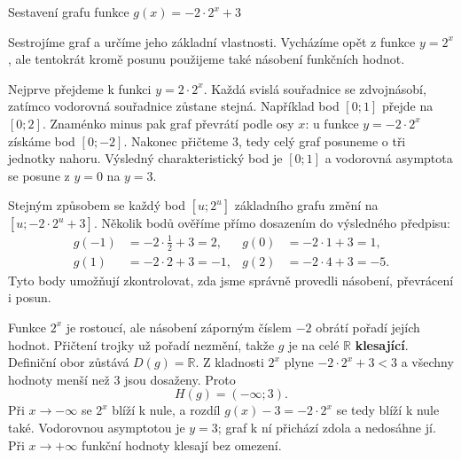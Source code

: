 \documentclass[12pt,a4paper]{article}
\begin{document}
\begin{examplebox}{Sestavení grafu funkce $g(x)=-2\cdot2^x+3$}

Sestrojíme graf a určíme jeho základní vlastnosti.
Vycházíme opět z funkce $y=2^x$, ale tentokrát kromě posunu použijeme také násobení funkčních hodnot.

Nejprve přejdeme k funkci $y=2\cdot2^x$.
Každá svislá souřadnice se zdvojnásobí, zatímco vodorovná souřadnice zůstane stejná.
Například bod $[0;1]$ přejde na $[0;2]$.
Znaménko minus pak graf převrátí podle osy $x$:
u funkce $y=-2\cdot2^x$ získáme bod $[0;-2]$.
Nakonec přičteme $3$, tedy celý graf posuneme o tři jednotky nahoru.
Výsledný charakteristický bod je $[0;1]$ a vodorovná asymptota se posune z $y=0$ na $y=3$.

Stejným způsobem se každý bod $[u;2^u]$ základního grafu změní na $[u;-2\cdot2^u+3]$.
Několik bodů ověříme přímo dosazením do výsledného předpisu:
\[
\begin{aligned}
g(-1)&=-2\cdot\frac12+3=2, & g(0)&=-2\cdot1+3=1,\\
g(1)&=-2\cdot2+3=-1, & g(2)&=-2\cdot4+3=-5.
\end{aligned}
\]
Tyto body umožňují zkontrolovat, zda jsme správně provedli násobení, převrácení i posun.

\begin{center}
\end{center}

Funkce $2^x$ je rostoucí, ale násobení záporným číslem $-2$ obrátí pořadí jejích hodnot.
Přičtení trojky už pořadí nezmění, takže $g$ je na celé $\mathbb{R}$ \textbf{klesající}.
Definiční obor zůstává $D(g)=\mathbb{R}$.
Z kladnosti $2^x$ plyne $-2\cdot2^x+3<3$ a všechny hodnoty menší než $3$ jsou dosaženy.
Proto
\[
    H(g)=(-\infty;3).
\]
Při $x\to-\infty$ se $2^x$ blíží k nule, a rozdíl $g(x)-3=-2\cdot2^x$ se tedy blíží k nule také.
Vodorovnou asymptotou je $y=3$; graf k ní přichází zdola a nedosáhne jí.
Při $x\to+\infty$ funkční hodnoty klesají bez omezení.
\end{examplebox}
\end{document}
